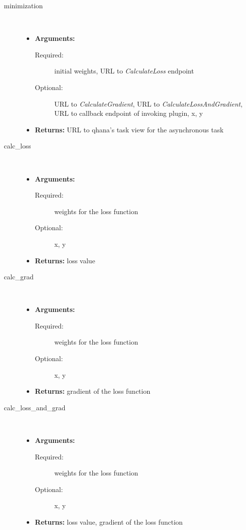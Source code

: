 \documentclass[
  a4paper,  %
  twoside,  %
  bibliography=totoc,
  headsepline,
  cleardoublepage=empty,
  parskip=half,
  draft=false
]{scrbook}
\begin{document}
\begin{description}
  \item[minimization] \hfill \\
  \begin{itemize}
      \item \textbf{Arguments:}
      \begin{description}
          \item[Required:] initial weights, URL to \emph{CalculateLoss} endpoint
          \item[Optional:] URL to \emph{CalculateGradient}, URL to \emph{CalculateLossAndGradient}, URL to callback endpoint of invoking plugin, x, y
      \end{description}
      \item \textbf{Returns:} URL to \gls{qhana}'s task view for the asynchronous task
  \end{itemize}

  \item[calc\_loss] \hfill \\
  \begin{itemize}
      \item \textbf{Arguments:}
      \begin{description}
          \item[Required:] weights for the loss function
          \item[Optional:] x, y
      \end{description}
      \item \textbf{Returns:} loss value
  \end{itemize}

  \item[calc\_grad] \hfill \\
  \begin{itemize}
      \item \textbf{Arguments:}
      \begin{description}
          \item[Required:] weights for the loss function
          \item[Optional:] x, y
      \end{description}
      \item \textbf{Returns:} gradient of the loss function
  \end{itemize}

  \item[calc\_loss\_and\_grad] \hfill \\
  \begin{itemize}
      \item \textbf{Arguments:}
      \begin{description}
          \item[Required:] weights for the loss function
          \item[Optional:] x, y
      \end{description}
      \item \textbf{Returns:} loss value, gradient of the loss function
  \end{itemize}


\end{description}
\end{document}
